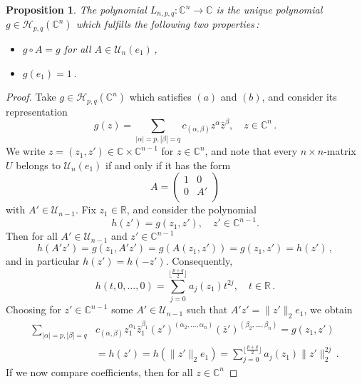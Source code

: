 \documentclass[12pt]{amsart}
\numberwithin{subsection}{section}
\newtheorem{proposition}[theorem]{Proposition}
\theoremstyle{definition}
\theoremstyle{remark}
\begin{document}
\smallskip
\begin{proposition} \label{propleg-comp}
The polynomial  $L_{n,p,q} \colon \mathbb{C}^n \to \mathbb{C} $ is the unique  polynomial
$g \in \mathcal{H}_{p,q}(\mathbb{C}^n) $ which fulfills the following two properties\,:
\begin{itemize}
\item[(a)]
$g\circ A = g $ for all  $A\in \mathcal{U}_n(e_1)$\,,
\item[(b)]
$g(e_1) = 1 $\,.
\end{itemize}
\end{proposition}

\begin{proof}
Take  $g \in \mathcal{H}_{p,q}(\mathbb{C}^n) $ which satisfies  $(a) $ and  $(b) $,  and consider its representation
\[
g(z) = \sum_{|\alpha|=p, |\beta|=q} c_{(\alpha,\beta)}
z^\alpha \bar{z}^\beta , \quad z \in \mathbb{C}^n\,.
\]
We write  $z = (z_1,z') \in \mathbb{C} \times \mathbb{C}^{n-1} $ for   $z \in \mathbb{C}^n $, and note that
every  $n\times n $-matrix  $U $ belongs to  $\mathcal{U}_n(e_1) $ if and only if it has the form
\begin{equation}\label{0a0}
  A=
\begin{pmatrix}
  1 & 0  \\
  0 & A' \\
 \end{pmatrix}
\end{equation}
with  $A' \in \mathcal{U}_{n-1} $.  Fix  $z_1 \in \mathbb{R} $,  and consider the polynomial
\[
h(z') = g(z_1, z'),  \quad z' \in \mathbb{C}^{n-1}.
\]
Then for all  $A' \in \mathcal{U}_{n-1} $ and  $z' \in \mathbb{C}^{n-1} $
\[
 h(A'z')= g(z_1,A'z' ) = g(A(z_1,z') ) = g(z_1,z' )=  h(z')\,,
\]
and in particular  $h(z') = h(-z') $. Consequently,
\[
h(t, 0, \ldots, 0) = \sum_{j=0}^{\lfloor \frac{p+q}{2}\rfloor} a_j(z_1) t^{2j},  \quad t \in \mathbb{R}\,.
\]
Choosing for  $z' \in \mathbb{C}^{n-1} $ some  $A' \in \mathcal{U}_{n-1} $ such that  $A' z' = \|z'\|_2 e_1 $,
we obtain
\begin{align*}
  \sum_{|\alpha|=p,|\beta|=q} &c_{(\alpha,\beta)}
    z_1^{\alpha_1}\bar{z}_1^{\beta_1} (z')^{(\alpha_2, \ldots, \alpha_{n})}
  (\overline{z}')^{(\beta_2, \ldots, \beta_{n})}  =g(z_1,z')
\\&
 = h(z') = h(\|z'\|_2 e_1) = \sum_{j=0}^{\lfloor \frac{p+q}{2}\rfloor} a_j(z_1) \|z'\|_2^{2j}\,.
\end{align*}
If we now compare coefficients,  then for all  $z \in \mathbb{C}^n $


\end{proof}
\end{document}
